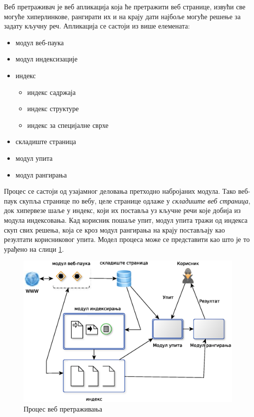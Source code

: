 Веб претраживач је веб апликација која ће претражити веб странице, извући све могуће хиперлинкове, рангирати их и на крају дати најбоље могуће решење за задату кључну реч. Апликација се састоји из више елемената:

\begin{itemize}
\item модул веб-паука
\item модул индексизације
\item индекс
      \begin{itemize}
      \item индекс садржаја
      \item индекс структуре
      \item индекс за специјалне сврхе
      \end{itemize}
\item складиште страница
\item модул упита
\item модул рангирања
\end{itemize}

Процес се састоји од узајамног деловања претходно набројаних модула. Тако веб-паук скупља странице по вебу, целе странице одлаже у \emph{складиште веб страница}, док хипервезе шаље у индекс, који их поставља уз кључне речи које добија из модула индексовања. Кад корисник пошаље упит, модул упита тражи од индекса скуп свих решења, која се кроз модул рангирања на крају постављају као резултати корисниковог упита. Модел процеса може се представити као што је то урађено на слици  \ref{slike:crawling}.

\begin{figure}
\centering
\includegraphics[scale=0.5]{crawler.eps}
\caption{Процес веб претраживања \cite[Ch 1.3.2]{langville2011google}}
\label{slike:crawling}
\end{figure}

